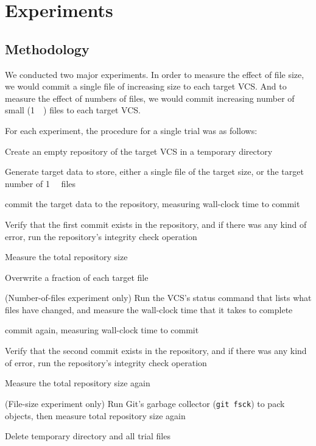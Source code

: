 \section{Experiments}




\subsection{Methodology}

We conducted two major experiments.
In order to measure the effect of file size, we would \gls{commit} a single file of increasing size to each target \gls{VCS}.
And to measure the effect of numbers of files, we would \gls{commit} increasing number of small (\SI{1}{\kibi\byte}) files to each target \gls{VCS}.


For each experiment, the procedure for a single trial was as follows:
\begin{tight_enumerate}
    \item Create an empty \gls{repository} of the target \gls{VCS} in a temporary directory
    \item Generate target data to store, either a single file of the target size, or the target number of \SI{1}{\kibi\byte} files
    \item \Gls{commit} the target data to the \gls{repository}, measuring wall-clock time to \gls{commit}
    \item Verify that the first \gls{commit} exists in the \gls{repository}, and if there was any kind of error, run the \gls{repository}'s integrity check operation
    \item Measure the total \gls{repository} size
    \item Overwrite a fraction of each target file
    \item (Number-of-files experiment only) Run the \gls{VCS}'s status command that lists what files have changed, and measure the wall-clock time that it takes to complete
    \item \Gls{commit} again, measuring wall-clock time to \gls{commit}
    \item Verify that the second \gls{commit} exists in the \gls{repository}, and if there was any kind of error, run the \gls{repository}'s integrity check operation
    \item Measure the total \gls{repository} size again
    \item (File-size experiment only) Run Git's garbage collector (\lstinline{git fsck}) to pack objects, then measure total \gls{repository} size again
    \item Delete temporary directory and all trial files
\end{tight_enumerate}

